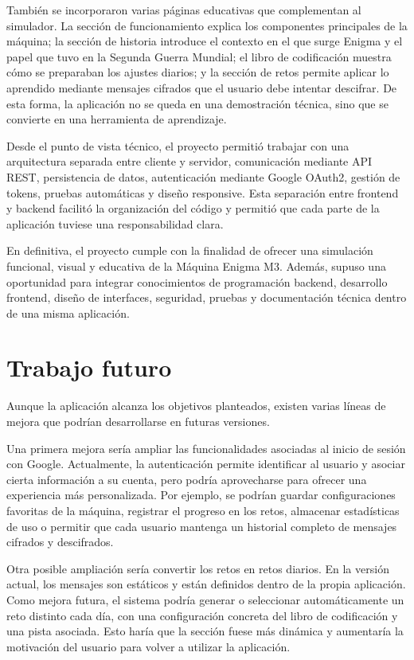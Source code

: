 También se incorporaron varias páginas educativas que complementan al simulador. La sección de funcionamiento explica los componentes principales de la máquina; la sección de historia introduce el contexto en el que surge Enigma y el papel que tuvo en la Segunda Guerra Mundial; el libro de codificación muestra cómo se preparaban los ajustes diarios; y la sección de retos permite aplicar lo aprendido mediante mensajes cifrados que el usuario debe intentar descifrar. De esta forma, la aplicación no se queda en una demostración técnica, sino que se convierte en una herramienta de aprendizaje.

Desde el punto de vista técnico, el proyecto permitió trabajar con una arquitectura separada entre cliente y servidor, comunicación mediante API REST, persistencia de datos, autenticación mediante Google OAuth2, gestión de tokens, pruebas automáticas y diseño responsive. Esta separación entre frontend y backend facilitó la organización del código y permitió que cada parte de la aplicación tuviese una responsabilidad clara.

En definitiva, el proyecto cumple con la finalidad de ofrecer una simulación funcional, visual y educativa de la Máquina Enigma M3. Además, supuso una oportunidad para integrar conocimientos de programación backend, desarrollo frontend, diseño de interfaces, seguridad, pruebas y documentación técnica dentro de una misma aplicación.

\section{Trabajo futuro}

Aunque la aplicación alcanza los objetivos planteados, existen varias líneas de mejora que podrían desarrollarse en futuras versiones.

Una primera mejora sería ampliar las funcionalidades asociadas al inicio de sesión con Google. Actualmente, la autenticación permite identificar al usuario y asociar cierta información a su cuenta, pero podría aprovecharse para ofrecer una experiencia más personalizada. Por ejemplo, se podrían guardar configuraciones favoritas de la máquina, registrar el progreso en los retos, almacenar estadísticas de uso o permitir que cada usuario mantenga un historial completo de mensajes cifrados y descifrados.

Otra posible ampliación sería convertir los retos en retos diarios. En la versión actual, los mensajes son estáticos y están definidos dentro de la propia aplicación. Como mejora futura, el sistema podría generar o seleccionar automáticamente un reto distinto cada día, con una configuración concreta del libro de codificación y una pista asociada. Esto haría que la sección fuese más dinámica y aumentaría la motivación del usuario para volver a utilizar la aplicación.

